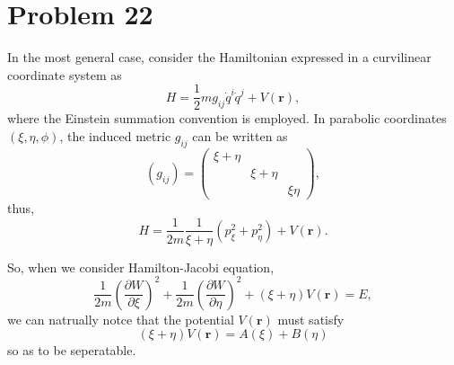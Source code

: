 \section*{Problem 22}   

    In the most general case, consider the Hamiltonian expressed in a curvilinear coordinate system as
    \begin{equation*}
        H = \frac{1}{2} m g_{ij} \dot{q}^i \dot{q}^j  +  V\left(\boldsymbol{r}\right),
    \end{equation*}
    where the Einstein summation convention is employed. In parabolic coordinates $(\xi, \eta, \phi)$, the induced metric $g_{ij}$ can be written as
    \begin{equation}
        \left(g_{ij}\right)  = \left(
        \begin{matrix}
            \xi + \eta  &               &           \\
                        & \xi + \eta    &           \\
                        &               &  \xi\eta
        \end{matrix}
        \right),
    \end{equation}
    thus,
    \begin{equation}
        H = \frac{1}{2m} \frac{1}{\xi+\eta} \left( p_\xi^2 + p_\eta^2 \right)  +  V\left(\boldsymbol{r}\right).
    \end{equation}

    So, when we consider Hamilton-Jacobi equation,
    \begin{equation}
        \frac{1}{2m} \left(\frac{\partial W}{\partial\xi}\right)^2 + \frac{1}{2m} \left(\frac{\partial W}{\partial\eta}\right)^2  +  \left(\xi+\eta\right)V\left(\boldsymbol{r}\right) = E,
    \end{equation}
    we can natrually notce that the potential $V\left(\boldsymbol{r}\right)$ must satisfy
    \begin{equation}
        \left(\xi+\eta\right)V\left(\boldsymbol{r}\right) = A\left(\xi\right) + B\left(\eta\right)
    \end{equation}
    so as to be seperatable.
